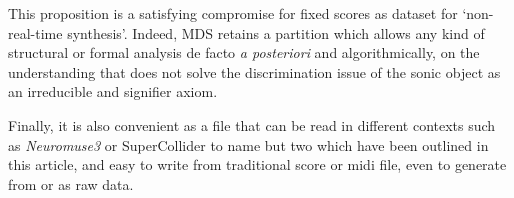This proposition is a satisfying compromise for fixed scores as dataset for `non-real-time synthesis'. Indeed, MDS retains a partition which allows any kind of structural or formal analysis de facto \textit{a posteriori} and algorithmically, on the understanding that does not solve the discrimination issue of the sonic object as an irreducible and signifier axiom. 

\bigskip 

Finally, it is also convenient as a file that can be read in different contexts such as  \textsl{Neuromuse3} or SuperCollider to name but two which have been outlined in this article, and easy to write from traditional score or midi file, even to generate from or as raw data.

\bigskip 




